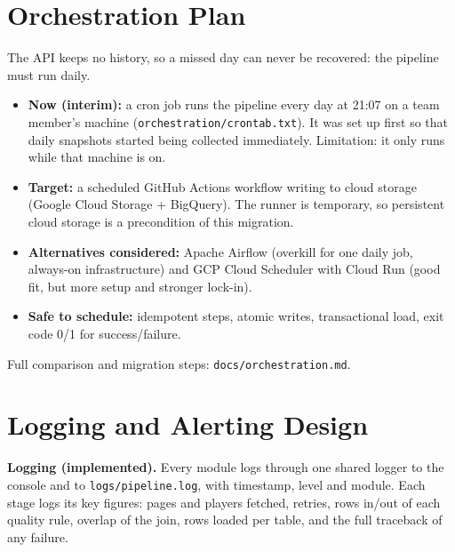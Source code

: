\documentclass[11pt,a4paper]{article}
\begin{document}
\section{Orchestration Plan}\label{sec:orch}
The API keeps no history, so a missed day can never be recovered: the
pipeline must run daily.

\begin{itemize}
  \item \textbf{Now (interim):} a cron job runs the pipeline every day at
        21:07 on a team member's machine (\texttt{orchestration/crontab.txt}).
        It was set up first so that daily snapshots started being collected
        immediately. Limitation: it only runs while that machine is on.
  \item \textbf{Target:} a scheduled GitHub Actions workflow writing to cloud
        storage (Google Cloud Storage + BigQuery). The runner is temporary,
        so persistent cloud storage is a precondition of this migration.
  \item \textbf{Alternatives considered:} Apache Airflow (overkill for one
        daily job, always-on infrastructure) and GCP Cloud Scheduler with
        Cloud Run (good fit, but more setup and stronger lock-in).
  \item \textbf{Safe to schedule:} idempotent steps, atomic writes,
        transactional load, exit code 0/1 for success/failure.
\end{itemize}
Full comparison and migration steps: \texttt{docs/orchestration.md}.

\section{Logging and Alerting Design}\label{sec:monitoring}
\textbf{Logging (implemented).} Every module logs through one shared logger
to the console and to \texttt{logs/pipeline.log}, with timestamp, level and
module. Each stage logs its key figures: pages and players fetched, retries,
rows in/out of each quality rule, overlap of the join, rows loaded per table,
and the full traceback of any failure.
\end{document}
